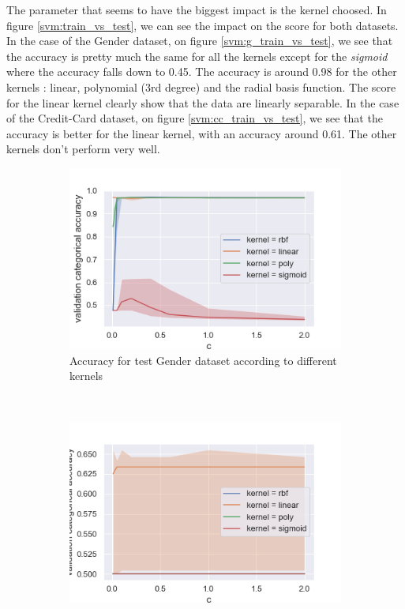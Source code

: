 \documentclass[10pt]{article}
\begin{document}
		The parameter that seems to have the biggest impact is the kernel choosed.
		In figure \ref{svm:train_vs_test}, we can see the impact on the score for both datasets. In the case of the Gender dataset, on figure \ref{svm:g_train_vs_test}, we see that the accuracy is pretty much the same for all the kernels except for the \textit{sigmoid} where the accuracy falls down to 0.45. The accuracy is around 0.98 for the other kernels : linear, polynomial (3rd degree) and the radial basis function. The score for the linear kernel clearly show that the data are linearly separable.
		In the case of the Credit-Card dataset, on figure \ref{svm:cc_train_vs_test}, we see that the accuracy is better for the linear kernel, with an accuracy around 0.61. The other kernels don't perform very well.

		\begin{figure}
			\centering
			\begin{subfigure}[]{0.45\columnwidth}
				\centering
				\includegraphics[width=\linewidth]{../graphics/svm_gender_c_score_type_kernel.png}
				\caption{Accuracy for test Gender dataset according to different kernels}
				\label{svm:g_c}
			\end{subfigure}
			~
			\begin{subfigure}[]{0.45\columnwidth}
				\centering
				\includegraphics[width=\linewidth]{../graphics/svm_creditcard_c_score_type_kernel.png}

\end{subfigure}
\end{figure}
\end{document}
